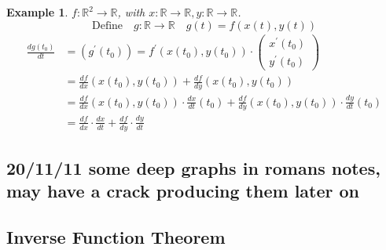\documentclass[12pt]{article}
\def\RR{\mathbb{R}}
\newtheorem{example}{Example}[section]
\begin{document}
\begin{example}
$f:\RR^2 \rightarrow \RR$, with $x:\RR \rightarrow \RR, y:\RR \rightarrow \RR$. 
\[\text{Define} \quad g:\RR \rightarrow \RR \quad g(t) = f(x(t),y(t))\]
\begin{align*}
\frac{dg(t_0)}{dt} &= (g^{'}(t_0)) = f^{'}(x(t_0), y(t_0)) \cdot \left(
    \begin{array}{c}
      x^{'}(t_0) \\
     y^{'}(t_0)
    \end{array}
  \right)\\
&= \frac{df}{dx}(x(t_0),y(t_0)) + \frac{df}{dy}(x(t_0),y(t_0))\\
&= \frac{df}{dx}(x(t_0),y(t_0)) \cdot  \frac{dx}{dt}(t_0) + \frac{df}{dy}(x(t_0),y(t_0)) \cdot  \frac{dy}{dt}(t_0) \\
&= \frac{df}{dx}\cdot \frac{dx}{dt} + \frac{df}{dy}\cdot \frac{dy}{dt}
\end{align*}
\end{example}

\subsection{20/11/11 some deep graphs in romans notes, may have a crack producing them later on}

\subsection{Inverse Function Theorem}
\end{document}
